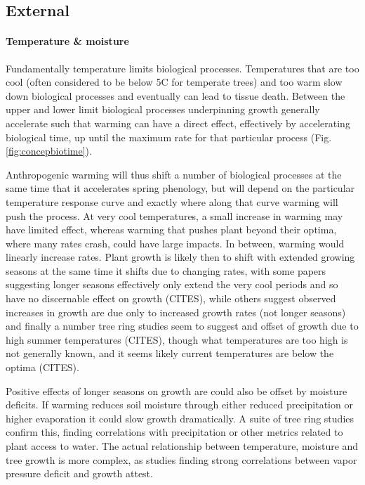\documentclass[11pt]{article}
\begin{document}
\subsection*{External}

\paragraph{Temperature \& moisture} %

Fundamentally temperature limits biological processes. Temperatures that are too cool (often considered to be below 5\degree C for temperate trees) and too warm \citep[an area of active research][, see also Fig. \ref{fig:temperaturecomplex}]{martinez2008hot,cabon2022cross} slow down biological processes and eventually can lead to tissue death. Between the upper and lower limit biological processes underpinning growth generally accelerate such that warming can have a direct effect, effectively by accelerating biological time, up until the maximum rate for that particular process (Fig. \ref{fig:concepbiotime}).

Anthropogenic warming will thus shift a number of biological processes at the same time that it accelerates spring phenology, but will depend on the particular temperature response curve and exactly where along that curve warming will push the process. At very cool temperatures, a small increase in warming may have limited effect, whereas warming that pushes plant beyond their optima, where many rates crash, could have large impacts. In between, warming would linearly increase rates. Plant growth is likely then to shift with extended growing seasons at the same time it shifts due to changing rates, with some papers suggesting longer seasons effectively only extend the very cool periods and so have no discernable effect on growth (CITES), while others suggest observed increases in growth are due only to increased growth rates (not longer seasons) and finally a number tree ring studies seem to suggest and offset of growth due to high summer temperatures (CITES), though what temperatures are too high is not generally known, and it seems likely current temperatures are below the optima (CITES). 

Positive effects of longer seasons on growth are could also be offset by moisture deficits. If warming reduces soil moisture through either reduced precipitation or higher evaporation it could slow growth dramatically. A suite of tree ring studies confirm this, finding correlations with precipitation or other metrics related to plant access to water. The actual relationship between temperature, moisture and tree growth is more complex, as studies finding strong correlations between vapor pressure deficit and growth attest. 
\end{document}

